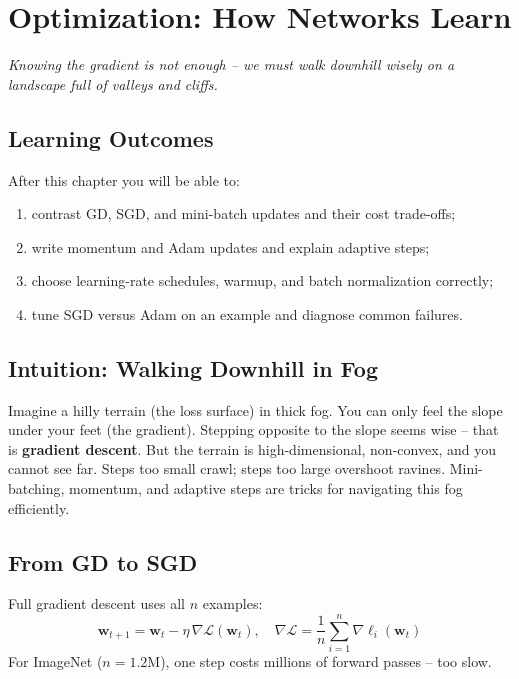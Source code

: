 \chapter{Optimization: How Networks Learn}\label{ch:optimization}
\begin{center}\small\textit{Knowing the gradient is not enough -- we must walk downhill wisely on a landscape full of valleys and cliffs.}\end{center}

\noindent{}
\vspace{0.3em}
\section*{Learning Outcomes}
After this chapter you will be able to:
\begin{enumerate}[label=(L\arabic*)]
    \item contrast GD, SGD, and mini-batch updates and their cost trade-offs;
    \item write momentum and Adam updates and explain adaptive steps;
    \item choose learning-rate schedules, warmup, and batch normalization correctly;
    \item tune SGD versus Adam on an example and diagnose common failures.
\end{enumerate}

\section{Intuition: Walking Downhill in Fog}
Imagine a hilly terrain (the loss surface) in thick fog. You can only feel the slope under your feet (the gradient). Stepping opposite to the slope seems wise -- that is \textbf{gradient descent}. But the terrain is high-dimensional, non-convex, and you cannot see far. Steps too small crawl; steps too large overshoot ravines. Mini-batching, momentum, and adaptive steps are tricks for navigating this fog efficiently.

\section{From GD to SGD}
Full gradient descent uses all $n$ examples:
\begin{equation}
\mathbf{w}_{t+1}=\mathbf{w}_t-\eta\,\nabla\mathcal{L}(\mathbf{w}_t),\quad \nabla\mathcal{L}=\frac1n\sum_{i=1}^n\nabla\ell_i(\mathbf{w}_t)
\end{equation}
For ImageNet ($n=1.2$M), one step costs millions of forward passes -- too slow.

